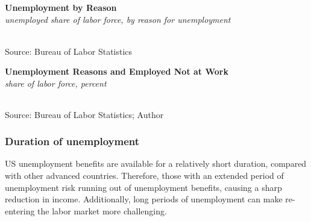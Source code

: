 \documentclass{report}
\makeatletter
\newcommand{\tbllink}[1]{\href{https://raw.githubusercontent.com/bdecon/US-chartbook/master/chartbook/data/#1}{\faTable}}
\newcommand*\short[1]{\expandafter\@gobbletwo\number\numexpr#1\relax}
\newcommand{\ctsbar}[5]{
		\addplot[ybar stacked, bar width=#5, draw opacity=0, fill=#1] 
			table [x=#2, y=#3, col sep=comma]{#4};}
\newcommand{\dateaxisticks}{
		date coordinates in=x, axis line style={draw=none},
		xmax={2021-06-15},
		max space between ticks=40,	    
		xtick={{1990-01-01}, {1992-01-01}, {1994-01-01}, 
			{1996-01-01}, {1998-01-01}, {2000-01-01}, 
			{2002-01-01}, {2004-01-01}, {2006-01-01},
			{2008-01-01}, {2010-01-01}, {2012-01-01}, {2014-01-01},
		    {2016-01-01}, {2018-01-01}, {2020-01-01}},
		minor xtick={{1989-01-01}, {1991-01-01}, {1993-01-01},
			{1995-01-01}, {1997-01-01}, {1999-01-01}, 
			{2001-01-01}, {2003-01-01}, {2005-01-01}, {2007-01-01},
		    {2009-01-01}, {2011-01-01}, {2013-01-01}, {2015-01-01},
		    {2017-01-01}, {2019-01-01}, {2021-01-01}},
		enlarge y limits={0.06}, enlarge x limits={0.01},
		}
\newcommand{\bbar}[2]{extra #1 ticks = {{#2}}, extra #1 tick labels = ,
		extra #1 tick style = {grid=major, grid style={thick, black!25}},}
\newcommand{\rbars}{
		\fill[color=black!10] (axis cs:{1990-07-01},\pgfkeysvalueof{/pgfplots/ymin}) rectangle 
			(axis cs:{1991-03-01}, \pgfkeysvalueof{/pgfplots/ymax});
		\fill[color=black!10] (axis cs:{2007-12-01},\pgfkeysvalueof{/pgfplots/ymin}) rectangle 
			(axis cs:{2009-07-01}, \pgfkeysvalueof{/pgfplots/ymax});
		\fill[color=black!10] (axis cs:{2001-03-01},\pgfkeysvalueof{/pgfplots/ymin}) rectangle 
			(axis cs:{2001-11-01}, \pgfkeysvalueof{/pgfplots/ymax});
		\fill[color=black!10] (axis cs:{2020-02-01},\pgfkeysvalueof{/pgfplots/ymin}) rectangle 
			(axis cs:{2021-06-15}, \pgfkeysvalueof{/pgfplots/ymax});}
\makeatother
\begin{document}
{{\begin{minipage}{0.99\textwidth} 
\normalsize \textbf{Unemployment by Reason}\\
\footnotesize{\textit{unemployed share of labor force, by reason for unemployment}}\\
\hspace*{-2mm} \\
\footnotesize{Source: Bureau of Labor Statistics} \hfill \tbllink{unemp_reason.csv}
\vspace{4mm}

\normalsize \textbf{Unemployment Reasons and Employed Not at Work}\\
\footnotesize{\textit{share of labor force, percent}}\\
 \setlength{\tabcolsep}{3.1pt} \color{black!90}
	{\renewcommand{\arraystretch}{1.55}
		\begin{tabular}{p{31mm} R{6.7mm} R{6.7mm} R{6.7mm} R{6.7mm} R{6.7mm} R{6.7mm} 
		   R{6.7mm} R{6.7mm} R{6.7mm} R{6.7mm} R{6.7mm}}
			  \hline
		\end{tabular}}\vspace{-2mm}
		
\footnotesize{Source: Bureau of Labor Statistics; Author}
\end{minipage}
\newpage
\begin{minipage}{0.76\textwidth} 
\subsubsection*{\color{black!70} \seriffont Duration of unemployment}
\small US unemployment benefits are available for a relatively short duration, compared with other advanced countries. Therefore, those with an extended period of unemployment risk running out of unemployment benefits, causing a sharp reduction in income. Additionally, long periods of unemployment can make re-entering the labor market more challenging. 


\end{minipage}}}
\end{document}
